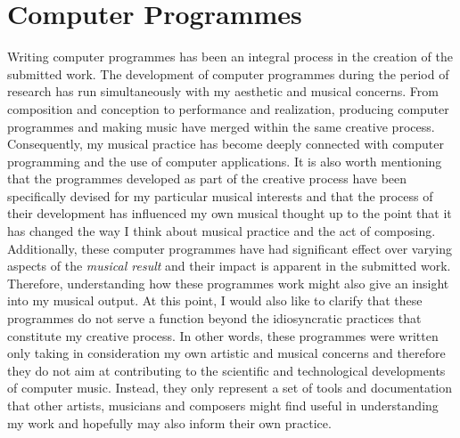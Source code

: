 \hypertarget{chapter5}{}
\chapter{Computer Programmes}

Writing computer programmes has been an integral process in the creation of the submitted work. The development of computer programmes during the period of research has run simultaneously with my aesthetic and musical concerns. From composition and conception to performance and realization, producing computer programmes and making music have merged within the same creative process. Consequently, my musical practice has become deeply connected with computer programming and the use of computer applications. It is also worth mentioning that the programmes developed as part of the creative process have been specifically devised for my particular musical interests and that the process of their development has influenced my own musical thought up to the point that it has changed the way I think about musical practice and the act of composing. Additionally, these computer programmes have had significant effect over varying aspects of the \emph{musical result} and their impact is apparent in the submitted work. Therefore, understanding how these programmes work might also give an insight into my musical output. At this point, I would also like to clarify that these programmes do not serve a function beyond the idiosyncratic practices that constitute my creative process. In other words, these programmes were written only taking in consideration my own artistic and musical concerns and therefore they do not aim at contributing to the scientific and technological developments of computer music. Instead, they only represent a set of tools and documentation that other artists, musicians and composers might find useful in understanding my work and hopefully may also inform their own practice.

